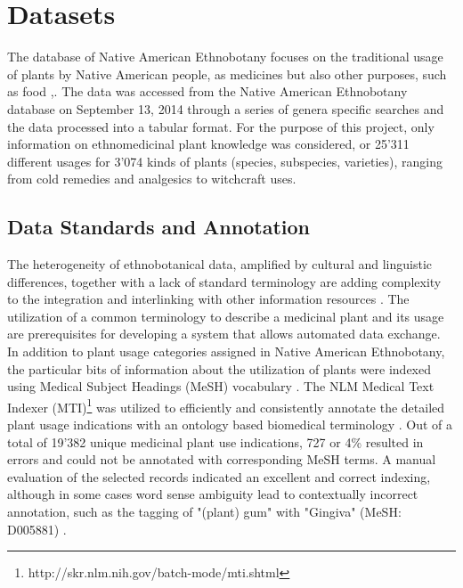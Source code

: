 \documentclass{acm_proc_article-sp}
\begin{document}
\section{Datasets}
The database of Native American Ethnobotany focuses on the traditional usage of plants by Native American people, as medicines but also other purposes, such as food \cite{moerman:analysis},\cite{moerman:native}. The data was accessed from the Native American Ethnobotany database on September 13, 2014 through a series of genera specific searches and the data processed into a tabular format. For the purpose of this project, only information on ethnomedicinal plant knowledge was considered, or 25'311 different usages for 3'074 kinds of plants (species, subspecies, varieties), ranging from cold remedies and analgesics to witchcraft uses. 

\subsection{Data Standards and Annotation}
The heterogeneity of ethnobotanical data, amplified by cultural and linguistic differences, together with a lack of standard terminology are adding complexity to the integration and interlinking with other information resources \cite{Cheung:TCM}. The utilization of a common terminology to describe a medicinal plant and its usage are prerequisites for developing a system that allows automated data exchange. In addition to plant usage categories assigned in Native American Ethnobotany, the particular bits of information about the utilization of plants were indexed using Medical Subject Headings (MeSH) vocabulary \cite{Bodenreider:UMLS}. The NLM Medical Text Indexer (MTI)\footnote{http://skr.nlm.nih.gov/batch-mode/mti.shtml} was utilized to efficiently and consistently annotate the detailed plant usage indications with an ontology based biomedical terminology \cite{Mork:MTI}. Out of a total of 19'382 unique medicinal plant use indications, 727 or 4\% resulted in errors and could not be annotated with corresponding MeSH terms. A manual evaluation of the selected records indicated an excellent and correct indexing, although in some cases word sense ambiguity lead to contextually incorrect annotation, such as the tagging of "(plant) gum" with "Gingiva" (MeSH: D005881) \cite{Stevenson:Disambiguation}.
\end{document}
